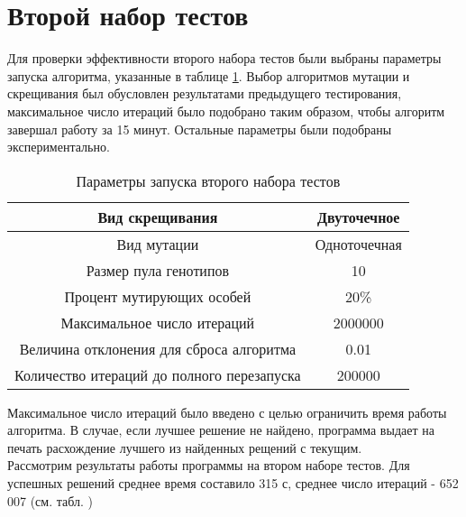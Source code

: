 \section{Второй набор тестов}
Для проверки эффективности второго набора тестов были выбраны  параметры запуска алгоритма, указанные в таблице \ref{ParamTable}. Выбор алгоритмов мутации и скрещивания был обусловлен результатами предыдущего тестирования, максимальное число итераций было подобрано таким образом, чтобы алгоритм завершал работу за 15 минут. Остальные параметры были подобраны экспериментально.

\begin{table}[ht]
\centering
\begin{tabular}{|c|c|}
\hline
Вид скрещивания                            & Двуточечное  \\ \hline
Вид мутации                                & Одноточечная \\ \hline
Размер пула генотипов                      & 10           \\ \hline
Процент мутирующих особей                  & 20\%         \\ \hline
Максимальное число итераций                & 2000000      \\ \hline
Величина отклонения для сброса алгоритма   & 0.01         \\ \hline
Количество итераций до полного перезапуска & 200000       \\ \hline
\end{tabular}
\caption{Параметры запуска второго набора тестов}
\label{ParamTable}
\end{table}
\FloatBarrier
Максимальное число итераций было введено с целью ограничить время работы алгоритма. В случае, если лучшее решение не найдено, программа выдает на печать расхождение лучшего из найденных рещений с текущим.\\
Рассмотрим результаты работы программы на втором наборе тестов.
Для успешных решений среднее время составило 315 с, среднее число итераций - 652 007 (см. табл. \cite{BigResults1})
